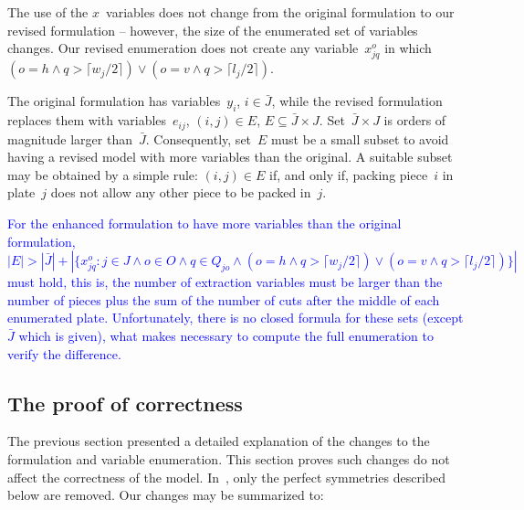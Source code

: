 \documentclass[smallextended]{svjour3}       %
\newif\iffinalversion
\newcommand{\newtext}[1]{\iffinalversion%
#1%
\else%
\textcolor{blue}{#1}%
\fi%
}
\begin{document}
The use of the \(x\)~variables does not change from the original formulation to our revised formulation -- however, the size of the enumerated set of variables changes.
Our revised enumeration does not create any variable~\(x^o_{jq}\) in which \((o = h \land q > \lceil w_j / 2 \rceil) \lor (o = v \land q > \lceil l_j / 2 \rceil)\).

The original formulation has variables~\(y_i\), \(i \in \bar{J}\), while the revised formulation replaces them with variables~\(e_{ij}\), \((i, j) \in E\), \(E \subseteq \bar{J} \times J\).
Set~\(\bar{J} \times J\) is orders of magnitude larger than~\(\bar{J}\).
Consequently, set~\(E\) must be a small subset to avoid having a revised model with more variables than the original.
A suitable subset may be obtained by a simple rule: \((i, j) \in E\) if, and only if, packing piece~\(i\) in plate~\(j\) does not allow any other piece to be packed in~\(j\).

\newtext{For the enhanced formulation to have more variables than the original formulation, \(|E| > |\bar{J}| + |\{x^o_{jq} : j \in J \land o \in O \land q \in Q_{jo} \land (o = h \land q > \lceil w_j / 2 \rceil) \lor (o = v \land q > \lceil l_j / 2 \rceil)\}|\) must hold, this is, the number of extraction variables must be larger than the number of pieces plus the sum of the number of cuts after the middle of each enumerated plate. Unfortunately, there is no closed formula for these sets (except \(\bar{J}\) which is given), what makes necessary to compute the full enumeration to verify the difference.}




\subsection{The proof of correctness}

The previous section presented a detailed explanation of the changes to the formulation and variable enumeration.
This section proves such changes do not affect the correctness of the model.
In~\cite{furini:2016}, only the perfect symmetries described below are removed.
Our changes may be summarized to:
\end{document}
